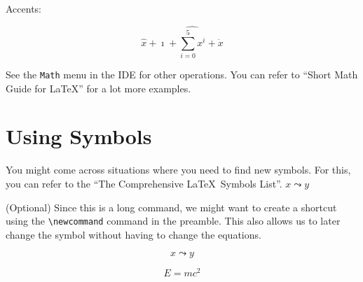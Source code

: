 \documentclass{article}
\newcommand{\flowsinto}{\leadsto}
\newcommand{\relitivity}{E=mc^2}
\begin{document}
Accents:

\[
  \hat{x} + \imath + \hat{\sum_{i=0}^{5} x^i} + \dot{x}
\]

See the \texttt{Math} menu in the IDE for other operations. You can refer to ``Short Math Guide for
\LaTeX'' for a lot more examples.

\section{Using Symbols}
You might come across situations where you need to find new symbols. For this, you can refer to the
``The Comprehensive \LaTeX\ Symbols List''. $x \leadsto y$

(Optional) Since this is a long command, we might want to create a shortcut using the
\verb|\newcommand| command in the preamble. This also allows us to later change the symbol without
having to change the equations.

\[
  x \flowsinto y
\]

\[
  \relitivity
\]
\end{document}
